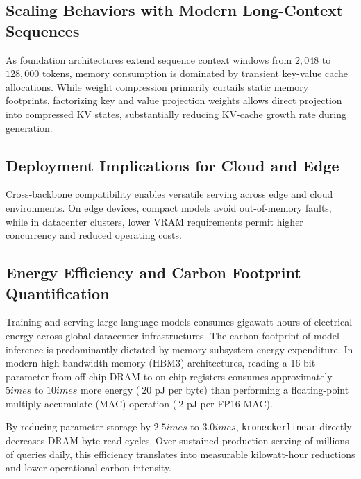 \subsection{Scaling Behaviors with Modern Long-Context Sequences}
As foundation architectures extend sequence context windows from $2{,}048$ to $128{,}000$ tokens, memory consumption is dominated by transient key-value cache allocations. While weight compression primarily curtails static memory footprints, factorizing key and value projection weights allows direct projection into compressed KV states, substantially reducing KV-cache growth rate during generation.

\subsection{Deployment Implications for Cloud and Edge}
Cross-backbone compatibility enables versatile serving across edge and cloud environments. On edge devices, compact models avoid out-of-memory faults, while in datacenter clusters, lower VRAM requirements permit higher concurrency and reduced operating costs.

\subsection{Energy Efficiency and Carbon Footprint Quantification}
Training and serving large language models consumes gigawatt-hours of electrical energy across global datacenter infrastructures. The carbon footprint of model inference is predominantly dictated by memory subsystem energy expenditure. In modern high-bandwidth memory (HBM3) architectures, reading a 16-bit parameter from off-chip DRAM to on-chip registers consumes approximately $5	imes$ to $10	imes$ more energy ($~20$ pJ per byte) than performing a floating-point multiply-accumulate (MAC) operation ($~2$ pJ per FP16 MAC).

By reducing parameter storage by $2.5	imes$ to $3.0	imes$, \texttt{kroneckerlinear} directly decreases DRAM byte-read cycles. Over sustained production serving of millions of queries daily, this efficiency translates into measurable kilowatt-hour reductions and lower operational carbon intensity.
